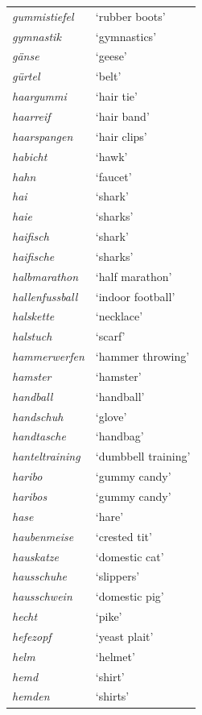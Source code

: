 \begin{longtable}{ll}
\textit{gummistiefel} & `rubber boots' \\
\textit{gymnastik} & `gymnastics' \\
\textit{gänse} & `geese' \\
\textit{gürtel} & `belt' \\
\textit{haargummi} & `hair tie' \\
\textit{haarreif} & `hair band' \\
\textit{haarspangen} & `hair clips' \\
\textit{habicht} & `hawk' \\
\textit{hahn} & `faucet' \\
\textit{hai} & `shark' \\
\textit{haie} & `sharks' \\
\textit{haifisch} & `shark' \\
\textit{haifische} & `sharks' \\
\textit{halbmarathon} & `half marathon' \\
\textit{hallenfussball} & `indoor football' \\
\textit{halskette} & `necklace' \\
\textit{halstuch} & `scarf' \\
\textit{hammerwerfen} & `hammer throwing' \\
\textit{hamster} & `hamster' \\
\textit{handball} & `handball' \\
\textit{handschuh} & `glove' \\
\textit{handtasche} & `handbag' \\
\textit{hanteltraining} & `dumbbell training' \\
\textit{haribo} & `gummy candy' \\
\textit{haribos} & `gummy candy' \\
\textit{hase} & `hare' \\
\textit{haubenmeise} & `crested tit' \\
\textit{hauskatze} & `domestic cat' \\
\textit{hausschuhe} & `slippers' \\
\textit{hausschwein} & `domestic pig' \\
\textit{hecht} & `pike' \\
\textit{hefezopf} & `yeast plait' \\
\textit{helm} & `helmet' \\
\textit{hemd} & `shirt' \\
\textit{hemden} & `shirts' \\

\end{longtable}
